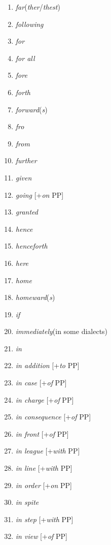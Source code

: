 \begin{multicols}{3}
\begin{enumerate}[noitemsep]
    \item \textit{far}(\textit{ther}/\textit{thest})
    \item \textit{following}
    \item \textit{for}
    \item \textit{for all}
    \item \textit{fore}
    \item \textit{forth}
    \item \textit{forward}(\textit{s})
    \item \textit{fro}
    \item \textit{from}
    \item \textit{further}
    \item \textit{given}
    \item \textit{going} [+\textit{on} PP]
    \item \textit{granted}
    \item \textit{hence}
    \item \textit{henceforth}
    \item \textit{here}
    \item \textit{home}
    \item \textit{homeward}(\textit{s})
    \item \textit{if}
    \item \textit{immediately}\newline(in some dialects)
    \item \textit{in}
    \item \textit{in addition} [+\textit{to} PP]
    \item \textit{in case} [+\textit{of} PP]
    \item \textit{in charge} [+\textit{of} PP]
    \item \textit{in consequence} [+\textit{of} PP]
    \item \textit{in front} [+\textit{of} PP]
    \item \textit{in league} [+\textit{with} PP]
    \item \textit{in line} [+\textit{with} PP]
    \item \textit{in order} [+\textit{on} PP]
    \item \textit{in spite}
    \item \textit{in step} [+\textit{with} PP]
    \item \textit{in view} [+\textit{of} PP]

\end{enumerate}
\end{multicols}
